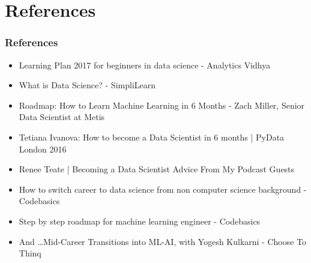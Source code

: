 \section[Refs]{References}

\begin{frame}[fragile]\frametitle{References}
\begin{itemize}
\item Learning Plan 2017 for beginners in data science - Analytics Vidhya
\item What is Data Science? - SimpliLearn
\item Roadmap: How to Learn Machine Learning in 6 Months -  Zach Miller, Senior Data Scientist at Metis
\item Tetiana Ivanova: How to become a Data Scientist in 6 months | PyData London 2016
\item Renee Teate | Becoming a Data Scientist Advice From My Podcast Guests
\item How to switch career to data science from non computer science background - Codebasics
\item Step by step roadmap for machine learning engineer - Codebasics
\item And \ldots Mid-Career Transitions into ML-AI, with Yogesh Kulkarni - Choose To Thinq
\end{itemize}
\end{frame}

